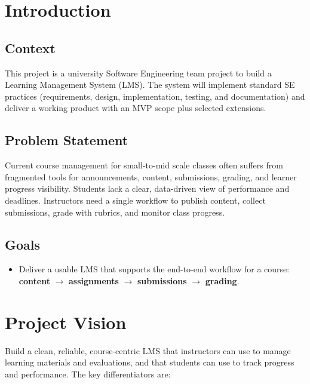 \documentclass[11pt, legalpaper]{article}
\begin{document}
\section{Introduction}

\subsection{Context}
This project is a university Software Engineering team project to build a Learning
Management System (LMS). The system will implement standard SE practices
(requirements, design, implementation, testing, and documentation) and deliver a
working product with an MVP scope plus selected extensions.

\subsection{Problem Statement}
Current course management for small-to-mid scale classes often suffers from
fragmented tools for announcements, content, submissions, grading, and learner
progress visibility. Students lack a clear, data-driven view of performance and
deadlines. Instructors need a single workflow to publish content, collect
submissions, grade with rubrics, and monitor class progress.

\subsection{Goals}
\begin{itemize}
  \item Deliver a usable LMS that supports the end-to-end workflow for a course:
        \textbf{content} $\rightarrow$ \textbf{assignments} $\rightarrow$
        \textbf{submissions} $\rightarrow$ \textbf{grading}.
\end{itemize}

\section{Project Vision}

Build a clean, reliable, course-centric LMS that instructors can use to manage
learning materials and evaluations, and that students can use to track progress
and performance. The key differentiators are:
\end{document}
